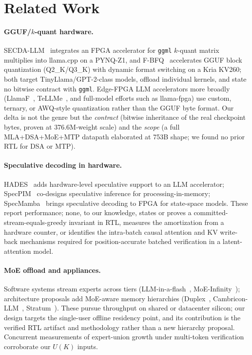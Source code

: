 \documentclass[11pt]{article}
\newcommand{\code}[1]{\texttt{#1}}
\begin{document}
\section{Related Work}

\paragraph{GGUF/$k$-quant hardware.} SECDA-LLM~\cite{secdallm} integrates an
FPGA accelerator for \code{ggml} $k$-quant matrix multiplies into llama.cpp on
a PYNQ-Z1, and F-BFQ~\cite{fbfq} accelerates GGUF block quantization
(Q2\_K/Q3\_K) with dynamic format switching on a Kria KV260; both target
TinyLlama/GPT-2-class models, offload individual kernels, and state no bitwise
contract with \code{ggml}. Edge-FPGA LLM accelerators more broadly
(LlamaF~\cite{llamaf}, TeLLMe~\cite{tellme}, and full-model efforts such as
llama-fpga) use custom, ternary, or AWQ-style quantization rather than the GGUF
byte format. Our delta is not the genre but the \emph{contract}
(bitwise inheritance of the real checkpoint bytes, proven at 376.6M-weight
scale) and the \emph{scope} (a full MLA{+}DSA{+}MoE{+}MTP datapath elaborated
at 753B shape; we found no prior RTL for DSA or MTP).

\paragraph{Speculative decoding in hardware.} HADES~\cite{hades} adds
hardware-level speculative support to an LLM accelerator; SpecPIM~\cite{specpim}
co-designs speculative inference for processing-in-memory;
SpecMamba~\cite{specmamba} brings speculative decoding to FPGA for state-space
models. These report performance; none, to our knowledge, states or proves a
committed-stream-equals-greedy invariant in RTL, measures the amortization from
a hardware counter, or identifies the intra-batch causal attention and KV
write-back mechanisms required for position-accurate batched verification in a
latent-attention model.

\paragraph{MoE offload and appliances.} Software systems stream experts across
tiers (LLM-in-a-flash~\cite{llminaflash}, MoE-Infinity~\cite{moeinfinity});
architecture proposals add MoE-aware memory hierarchies
(Duplex~\cite{duplex}, Cambricon-LLM~\cite{cambricon},
Stratum~\cite{stratum}). These pursue throughput on shared or datacenter
silicon; our design targets the single-user offline residency point, and its
contribution is the verified RTL artifact and methodology rather than a new
hierarchy proposal. Concurrent measurements of expert-union growth under
multi-token verification~\cite{cascade} corroborate our $U(K)$ inputs.
\end{document}
